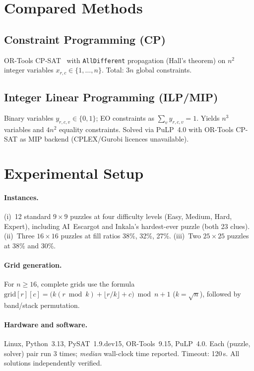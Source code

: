 \documentclass[preprint,10pt,authoryear]{elsarticle}
\begin{document}
\section{Compared Methods}
\label{sec:methods}

\subsection{Constraint Programming (CP)}
OR-Tools CP-SAT~\citep{ORTools2023} with \texttt{AllDifferent} propagation
(Hall's theorem) on $n^2$ integer variables $x_{r,c}\in\{1,\ldots,n\}$.
Total: $3n$ global constraints.

\subsection{Integer Linear Programming (ILP/MIP)}
Binary variables $y_{r,c,v}\in\{0,1\}$; EO constraints as
$\sum_v y_{r,c,v}=1$.
Yields $n^3$ variables and $4n^2$ equality constraints.
Solved via PuLP~4.0 with OR-Tools CP-SAT as MIP backend
(CPLEX/Gurobi licences unavailable).

\section{Experimental Setup}
\label{sec:setup}

\paragraph{Instances.}
(i)~12 standard $9\!\times\!9$ puzzles at four difficulty levels
(Easy, Medium, Hard, Expert), including AI~Escargot and Inkala's hardest-ever
puzzle (both 23 clues).
(ii)~Three $16\!\times\!16$ puzzles at fill ratios 38\%, 32\%, 27\%.
(iii)~Two $25\!\times\!25$ puzzles at 38\% and 30\%.

\paragraph{Grid generation.}
For $n\geq 16$, complete grids use the formula
$\text{grid}[r][c]=\bigl(k(r\bmod k)+\lfloor r/k\rfloor+c\bigr)\bmod n+1$
($k=\sqrt{n}$), followed by band/stack permutation.

\paragraph{Hardware and software.}
Linux, Python~3.13, PySAT~1.9.dev15, OR-Tools~9.15, PuLP~4.0.
Each (puzzle, solver) pair run 3 times; \emph{median} wall-clock time reported.
Timeout: 120\,s. All solutions independently verified.
\end{document}
